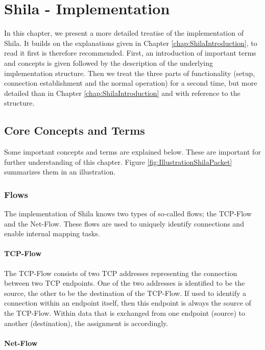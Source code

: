 \chapter{Shila - Implementation}
\label{chap:ShilaImplementation}

In this chapter, we present a more detailed treatise of the implementation of Shila. It builds on the explanations given in Chapter \ref{chap:ShilaIntroduction}, to read it first is therefore recommended. First, an introduction of important terms and concepts is given followed by the description of the underlying implementation structure. Then we treat the three parts of functionality (setup, connection establishment and the normal operation) for a second time, but more detailed than in Chapter \ref{chap:ShilaIntroduction} and with reference to the structure.

\section{Core Concepts and Terms}

Some important concepts and terms are explained below. These are important for further understanding of this chapter. Figure \ref{fig:IllustrationShilaPacket} summarizes them in an illustration.

\subsection{Flows}
\label{subsec:ShilaImplementationImportantConceptsFlows}

The implementation of Shila knows two types of so-called flows; the TCP-Flow and the Net-Flow.  These flows are used to uniquely identify connections and enable internal mapping tasks.

\subsubsection*{TCP-Flow}

The TCP-Flow consists of two TCP addresses representing the connection between two TCP endpoints. One of the two addresses is identified to be the source, the other to be the destination of the TCP-Flow. If used to identify a connection within an endpoint itself, then this endpoint is always the source of the TCP-Flow. Within data that is exchanged from one endpoint (source) to another (destination), the assignment is accordingly.

\subsubsection*{Net-Flow}


